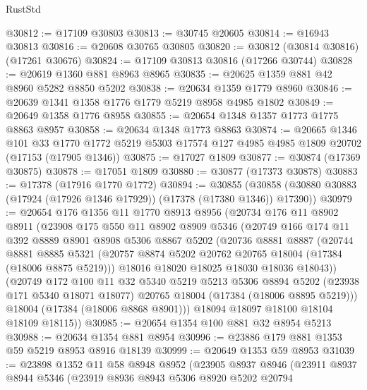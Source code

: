 \begin{lexlean}{RustStd}
\begin{coremodule}
@30812 := @17109 @30803
@30813 := @30745 @20605
@30814 := @16943 @30813
@30816 := @20608 @30765 @30805
@30820 := @30812 (@30814 @30816) (@17261 @30676)
@30824 := @17109 @30813 @30816 (@17266 @30744)
@30828 := @20619 @1360 @881 @8963 @8965
@30835 := @20625 @1359 @881 @42 @8960 @5282 @8850 @5202
@30838 := @20634 @1359 @1779 @8960
@30846 := @20639 @1341 @1358 @1776 @1779 @5219 @8958 @4985 @1802
@30849 := @20649 @1358 @1776 @8958
@30855 := @20654 @1348 @1357 @1773 @1775 @8863 @8957
@30858 := @20634 @1348 @1773 @8863
@30874 := @20665
    @1346
    @101
    @33
    @1770
    @1772
    @5219
    @5303
    @17574
    @127
    @4985
    @4985
    @1809
    @20702
    (@17153 (@17905 @1346))
@30875 := @17027 @1809
@30877 := @30874 (@17369 @30875)
@30878 := @17051 @1809
@30880 := @30877 (@17373 @30878)
@30883 := @17378 (@17916 @1770 @1772)
@30894 := @30855
    (@30858 (@30880 @30883 (@17924 (@17926 @1346 @17929)) (@17378 (@17380 @1346)) @17390))
@30979 := @20654
    @176
    @1356
    @11
    @1770
    @8913
    @8956
    (@20734
      @176
      @11
      @8902
      @8911
      (@23908
        @175
        @550
        @11
        @8902
        @8909
        @5346
        (@20749
          @166
          @174
          @11
          @392
          @8889
          @8901
          @8908
          @5306
          @8867
          @5202
          (@20736
            @8881
            @8887
            (@20744
              @8881
              @8885
              @5321
              (@20757 @8874 @5202 @20762 @20765 @18004 (@17384 (@18006 @8875 @5219)))
              @18016
              @18020
              @18025
              @18030
              @18036
              @18043))
          (@20749
            @172
            @100
            @11
            @32
            @5340
            @5219
            @5213
            @5306
            @8894
            @5202
            (@23938 @171 @5340 @18071 @18077)
            @20765
            @18004
            (@17384 (@18006 @8895 @5219)))
          @18004
          (@17384 (@18006 @8868 @8901)))
        @18094
        @18097
        @18100
        @18104
        @18109
        @18115))
@30985 := @20654 @1354 @100 @881 @32 @8954 @5213
@30988 := @20634 @1354 @881 @8954
@30996 := @23886 @179 @881 @1353 @59 @5219 @8953 @8916 @18139
@30999 := @20649 @1353 @59 @8953
@31039 := @23898
    @1352
    @11
    @58
    @8948
    @8952
    (@23905
      @8937
      @8946
      (@23911
        @8937
        @8944
        @5346
        (@23919
          @8936
          @8943
          @5306
          @8920
          @5202
          @20794

\end{coremodule}
\end{lexlean}
